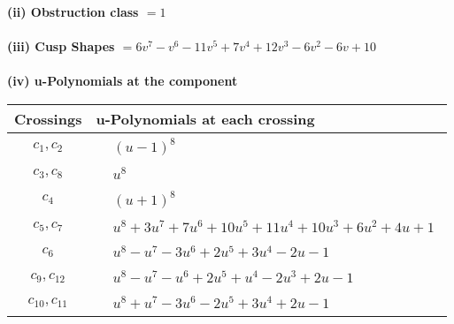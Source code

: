 \documentclass[1p]{elsarticle_modified}
\theoremstyle{definition}
\begin{document}
\flushleft \textbf{(ii) Obstruction class $= 1$}\\~\\
\flushleft \textbf{(iii) Cusp Shapes $= 6 v^7- v^6-11 v^5+7 v^4+12 v^3-6 v^2-6 v+10$}\\~\\
\newpage\renewcommand{\arraystretch}{1}
\flushleft \textbf{(iv) u-Polynomials at the component}\newline \\
\begin{tabular}{m{50pt}|m{274pt}}
Crossings & \hspace{64pt}u-Polynomials at each crossing \\
\hline $$\begin{aligned}c_{1},c_{2}\end{aligned}$$&$\begin{aligned}
&(u-1)^8
\end{aligned}$\\
\hline $$\begin{aligned}c_{3},c_{8}\end{aligned}$$&$\begin{aligned}
&u^8
\end{aligned}$\\
\hline $$\begin{aligned}c_{4}\end{aligned}$$&$\begin{aligned}
&(u+1)^8
\end{aligned}$\\
\hline $$\begin{aligned}c_{5},c_{7}\end{aligned}$$&$\begin{aligned}
&u^8+3 u^7+7 u^6+10 u^5+11 u^4+10 u^3+6 u^2+4 u+1
\end{aligned}$\\
\hline $$\begin{aligned}c_{6}\end{aligned}$$&$\begin{aligned}
&u^8- u^7-3 u^6+2 u^5+3 u^4-2 u-1
\end{aligned}$\\
\hline $$\begin{aligned}c_{9},c_{12}\end{aligned}$$&$\begin{aligned}
&u^8- u^7- u^6+2 u^5+u^4-2 u^3+2 u-1
\end{aligned}$\\
\hline $$\begin{aligned}c_{10},c_{11}\end{aligned}$$&$\begin{aligned}
&u^8+u^7-3 u^6-2 u^5+3 u^4+2 u-1
\end{aligned}$\\
\hline
\end{tabular}\\~\\
\end{document}
